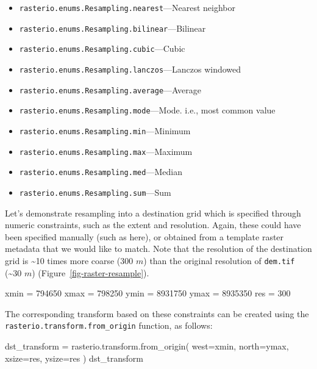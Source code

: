 \documentclass[
  letterpaper,
]{krantz}
\newenvironment{Shaded}{\begin{snugshade}}{\end{snugshade}}
\newcommand{\DecValTok}[1]{\textcolor[rgb]{0.68,0.00,0.00}{#1}}
\newcommand{\NormalTok}[1]{\textcolor[rgb]{0.00,0.23,0.31}{#1}}
\newcommand{\OperatorTok}[1]{\textcolor[rgb]{0.37,0.37,0.37}{#1}}
\providecommand{\tightlist}{%
  \setlength{\itemsep}{0pt}\setlength{\parskip}{0pt}}\usepackage{longtable,booktabs,array}
\begin{document}
\begin{itemize}
\tightlist
\item
  \texttt{rasterio.enums.Resampling.nearest}---Nearest neighbor
\item
  \texttt{rasterio.enums.Resampling.bilinear}---Bilinear
\item
  \texttt{rasterio.enums.Resampling.cubic}---Cubic
\item
  \texttt{rasterio.enums.Resampling.lanczos}---Lanczos windowed
\item
  \texttt{rasterio.enums.Resampling.average}---Average
\item
  \texttt{rasterio.enums.Resampling.mode}---Mode. i.e., most common
  value
\item
  \texttt{rasterio.enums.Resampling.min}---Minimum
\item
  \texttt{rasterio.enums.Resampling.max}---Maximum
\item
  \texttt{rasterio.enums.Resampling.med}---Median
\item
  \texttt{rasterio.enums.Resampling.sum}---Sum
\end{itemize}

Let's demonstrate resampling into a destination grid which is specified
through numeric constraints, such as the extent and resolution. Again,
these could have been specified manually (such as here), or obtained
from a template raster metadata that we would like to match. Note that
the resolution of the destination grid is \textasciitilde10 times more
coarse (300 \(m\)) than the original resolution of \texttt{dem.tif}
(\textasciitilde30 \(m\)) (Figure~\ref{fig-raster-resample}).

\begin{Shaded}
\begin{Highlighting}[]
\NormalTok{xmin }\OperatorTok{=} \DecValTok{794650}
\NormalTok{xmax }\OperatorTok{=} \DecValTok{798250}
\NormalTok{ymin }\OperatorTok{=} \DecValTok{8931750} 
\NormalTok{ymax }\OperatorTok{=} \DecValTok{8935350}
\NormalTok{res }\OperatorTok{=} \DecValTok{300}
\end{Highlighting}
\end{Shaded}

The corresponding transform based on these constraints can be created
using the \texttt{rasterio.transform.from\_origin} function, as follows:

\begin{Shaded}
\begin{Highlighting}[]
\NormalTok{dst\_transform }\OperatorTok{=}\NormalTok{ rasterio.transform.from\_origin(}
\NormalTok{    west}\OperatorTok{=}\NormalTok{xmin, }
\NormalTok{    north}\OperatorTok{=}\NormalTok{ymax, }
\NormalTok{    xsize}\OperatorTok{=}\NormalTok{res, }
\NormalTok{    ysize}\OperatorTok{=}\NormalTok{res}
\NormalTok{)}
\NormalTok{dst\_transform}
\end{Highlighting}
\end{Shaded}
\end{document}
